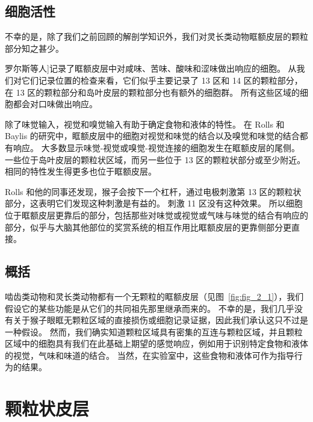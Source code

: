 \subsection{细胞活性}

不幸的是，除了我们之前回顾的解剖学知识外，我们对灵长类动物眶额皮层的颗粒部分知之甚少。\par


罗尔斯等人\cite{rolls1994emotion}]记录了眶额皮层中对咸味、苦味、酸味和涩味做出响应的细胞。
从我们对它们记录位置的检查来看，它们似乎主要记录了 13 区和 14 区的颗粒部分，在 13 区的颗粒部分和岛叶皮层的颗粒部分也有额外的细胞群。
所有这些区域的细胞都会对口味做出响应。\par


除了味觉输入，视觉和嗅觉输入有助于确定食物和液体的特性。
在 Rolls 和 Baylis 的研究中，眶额皮层中的细胞对视觉和味觉的结合以及嗅觉和味觉的结合都有响应。
大多数显示味觉-视觉或嗅觉-视觉连接的细胞发生在眶额皮层的尾侧。
一些位于岛叶皮层的颗粒状区域，而另一些位于 13 区的颗粒状部分或至少附近。
相同的特性发生得更多也位于眶额皮层。\par


Rolls 和他的同事还发现，猴子会按下一个杠杆，通过电极刺激第 13 区的颗粒状部分，这表明它们发现这种刺激是有益的\cite{mora1980electrophysiological}。
刺激 11 区没有这种效果。
所以细胞位于眶额皮层更靠后的部分，包括那些对味觉或视觉或气味与味觉的结合有响应的部分，似乎与大脑其他部位的奖赏系统的相互作用比眶额皮层的更靠侧部分更直接。\par



\subsection{概括}

啮齿类动物和灵长类动物都有一个无颗粒的眶额皮层（见图~\ref{fig:fig_2_1}），我们假设它的某些功能是从它们的共同祖先那里继承而来的。
不幸的是，我们几乎没有关于猴子眼眶无颗粒区域的直接损伤或细胞记录证据，因此我们承认这只不过是一种假设。
然而，我们确实知道颗粒区域具有密集的互连与颗粒区域，并且颗粒区域中的细胞具有我们在此基础上期望的感觉响应，例如用于识别特定食物和液体的视觉，气味和味道的结合。
当然，在实验室中，这些食物和液体可作为指导行为的结果。\par



\section{颗粒状皮层}

